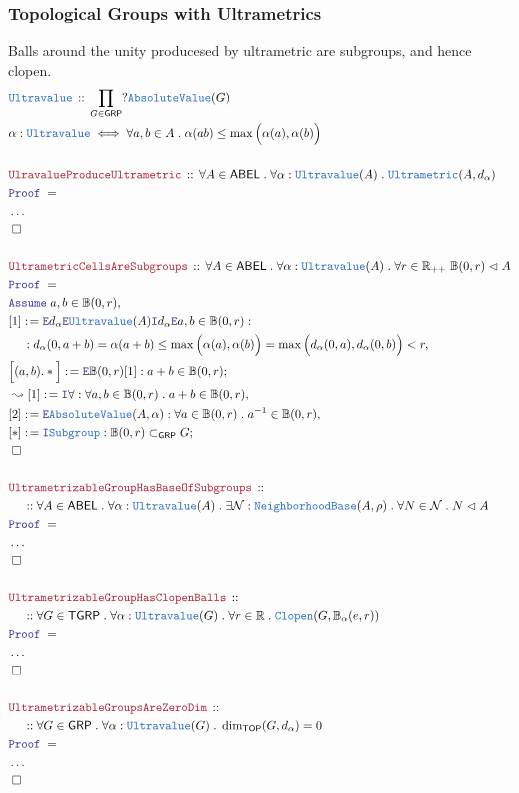 \documentclass[12pt]{scrartcl}
\newcommand{\TYPE}[1]{\textcolor{NavyBlue}{\mathtt{#1}}}
\newcommand{\LOGIC}[1]{\textcolor{Blue}{\mathtt{#1}}}
\newcommand{\THM}[1]{\textcolor{Maroon}{\mathtt{#1}}}
\renewcommand{\.}{\; . \;}
\newcommand{\de}{: \kern 0.1pc =}
\newcommand{\Theorem}[2]{& \THM{#1} \, :: \, #2 \\ & \Proof = \\ }
\newcommand{\DeclareType}[2]{& \TYPE{#1} \, :: \, #2 \\}
\newcommand{\DefineType}[3]{& #1 : \TYPE{#2} \iff #3 \\}
\newcommand{\NewLine}{\\ & \kern 1pc}
\newcommand{\Page}[1]{ \begin{align*} #1 \end{align*}   }
\newcommand{\NoProof}{ & \ldots \\ \EndProof}
\newcommand{\Reals}{\mathbb{R} }
\newcommand{\Say}[3]{& #1 \de #2 : #3, \\}
\newcommand{\Conclude}[3]{& #1 \de #2 : #3; \\}
\newcommand{\Derive}[3]{& \leadsto #1 \de #2 : #3, \\}
\newcommand{\AssumeIn}[2]{& \LOGIC{Assume} \; #1 \in #2, \\}
\newcommand{\Intro}{\LOGIC{I}}
\newcommand{\Elim}{\LOGIC{E}}
\newcommand{\QED}{\; \square}
\newcommand{\EndProof}{& \QED \\}
\newcommand{\Proof}{\LOGIC{Proof} \; }
\newcommand{\NbhdBase}{\TYPE{NeighborhoodBase}}
\newcommand{\TOP}{\mathsf{TOP}}
\newcommand{\Cell}{\mathbb{B}}
\newcommand{\Sgrp}{\subset_{\mathsf{GRP}}}
\newcommand{\Nrml}{\vartriangleleft}
\newcommand{\GRP}{\mathsf{GRP}}
\newcommand{\ABEL}{\mathsf{ABEL}}
\newcommand{\TGRP}{\mathsf{TGRP}}
\begin{document}
\subsubsection{Topological Groups with Ultrametrics}
Balls around the unity producesed by ultrametric are subgroups, and hence clopen.
\Page{
	\DeclareType{Ultravalue}
	{
		\prod_{G \in \GRP} ?\TYPE{AbsoluteValue}(G)
	}
	\DefineType{\alpha}{Ultravalue}
	{
			\forall a,b \in A \. \alpha(ab) \le \max\Big(\alpha(a),\alpha(b)\Big)
	}
	\\
	\Theorem{UlravalueProduceUltrametric}
	{
		\forall A \in \ABEL \.
		\forall \alpha : \TYPE{Ultravalue}(A) \.
		\TYPE{Ultrametric}(A,d_\alpha)
	}
	\NoProof
	\\
	\Theorem{UltrametricCellsAreSubgroups}
	{
		\forall A \in \ABEL \.
		\forall \alpha : \TYPE{Ultravalue}(A) \.
		\forall r \in \Reals_{++} \
		\Cell(0,r) \Nrml A
	}
	\AssumeIn{a,b}{\Cell(0,r)}
	\Say{[1]}
	{
			\Elim d_\alpha
			\Elim \TYPE{Ultravalue}(A)
			\Intro d_\alpha
			\Elim a,b \in \Cell(0,r)
	}
	{
		\NewLine :		
		d_\alpha(0,a+b) = 
		\alpha(a + b) \le 
		\max\Big(\alpha(a),\alpha(b)\Big) =
		\max\Big(d_\alpha(0,a),d_\alpha(0,b)\Big) <
		r
	}
	\Conclude{\Big[(a,b).*\Big]}
	{
		\Elim \Cell(0,r)[1]
	}
	{
		a + b \in \Cell(0,r)
	}
	\Derive{[1]}{\Intro \forall}
	{
		\forall a,b \in \Cell(0,r) \.
		a + b \in \Cell(0,r)
	}
	\Say{[2]}{\Elim \TYPE{AbsoluteValue}(A,\alpha)}
	{
		\forall a \in \Cell(0,r) \. a^{-1} \in \Cell(0,r)
	}
	\Conclude{[*]}{\Intro \TYPE{Subgroup}}
	{
		\Cell(0,r) \Sgrp G
	}
	\EndProof
	\\
	\Theorem{UltrametrizableGroupHasBaseOfSubgroups}
	{
		\NewLine ::		
		\forall A \in \ABEL \.
		\forall \alpha : \TYPE{Ultravalue}(A) \.
		\exists \mathcal{N} : \NbhdBase(A,\rho) \.
		\forall N \in \mathcal{N} \. N \Nrml A
	}
	\NoProof
	\\
	\Theorem{UltrametrizableGroupHasClopenBalls}
	{
		\NewLine ::		
		\forall G \in \TGRP \.
		\forall \alpha : \TYPE{Ultravalue}(G) \.
		\forall r \in \Reals \.
		\TYPE{Clopen}(G,\Cell_\alpha(e,r))
	}
	\NoProof
	\\
	\Theorem{UltrametrizableGroupsAreZeroDim}
	{
		\NewLine ::		
		\forall G \in \GRP \.
		\forall \alpha : \TYPE{Ultravalue}(G) \.
		\dim_\TOP (G,d_\alpha) = 0
	}
	\NoProof
}
\newpage
\end{document}
